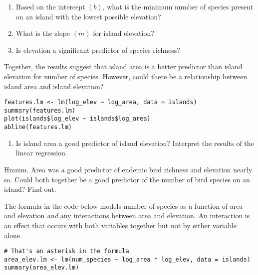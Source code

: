 \documentclass[11pt]{article}
\newcommand{\bigSpace}{\vspace{4\baselineskip}}
\begin{document}
\begin{enumerate}[resume]

\item Based on the intercept $(b)$, what is the minimum number of species present on an island with the lowest possible elevation?

\vspace{2\baselineskip}

\item What is the slope $(m)$ for island elevation?

\vspace{2\baselineskip}

\item Is elevation a significant predictor of species richness? 

\bigSpace

\end{enumerate}

Together, the results suggest that island area is a better predictor than island elevation for number of species. However, could there be a relationship between island area and island elevation?

\begin{verbatim}
features.lm <- lm(log_elev ~ log_area, data = islands)
summary(features.lm)
plot(islands$log_elev ~ islands$log_area)
abline(features.lm)
\end{verbatim}

\begin{enumerate}[resume]
\item Is island area a good predictor of island elevation? Interpret the results of the linear regression.

\bigSpace

\end{enumerate}

Hmmm. Area was a good predictor of endemic bird richness and elevation nearly so. Could both together be a good predictor of the number of bird species on an island? Find out.

The formula in the code below models number of species as a function of area and elevation \emph{and} any interactions between area and elevation. An interaction is an effect that occurs with  both variables together but not by either variable alone.

\begin{verbatim}
# That's an asterisk in the formula
area_elev.lm <- lm(num_species ~ log_area * log_elev, data = islands)
summary(area_elev.lm)
\end{verbatim}
\end{document}
